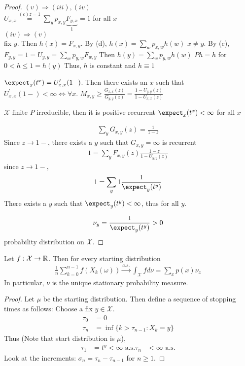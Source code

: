 \documentclass[mfit.tex]{subfiles}
\begin{document}
\begin{proof}
  $(v) \Rightarrow (iii),(iv)$\\
  $U_{x,x} \overset{(c) z=1}{=} \sum_y p_{x,y} \underbrace{F_{y,x}}_{1} = 1$ for all $x$\\
  $(iv) \Rightarrow (v)$\\
  fix $y$. Then $h(x) = F_{x,y}$. By (d), $h(x) = \sum_w p_{x,w} h(w)$ $x \neq y$.
  By (c), $F_{y,y} = 1 = U_{y,y} = \sum_w p_{y,w} F_{w,y}$
  Then $h(y) = \sum_w p_{y,w} h(w)$
  $P h = h$ for $0 < h \leq 1 = h(y)$
  Thus, $h$ is constant and $h \equiv 1$
  
  $\expect_x(t^x) = U_{x,x}^\prime(1-)$.
  Then there exists an $x$ such that $U_{x,x}^\prime (1-) < \infty \iff \forall x$.
  $M_{x,y} \geq \frac{G_{x,x}(z)}{G_{y,y}(z)} = \frac{1 - U_{y,y}(z)}{1- U_{x,x}(z)}$
  
  $\mathcal{X}$ finite $P$ irreducible, then it is positive recurrent $\expect_x(t^x) < \infty$ for all $x$
  
  \begin{align*}
    \sum_y G_{x,y}(z) = \frac{1}{1-z}
  \end{align*}
  Since $z \to 1-$, there exists a $y$ such that $G_{x,y} = \infty$ is recurrent
  \begin{align*}
    1 = \sum_y F_{x,y}(z) \frac{1-z}{1-U_{y,y}(z)}
  \end{align*}
  since $z \to 1-$,
  \begin{align*}
    1 = \sum_y 1 \frac{1}{\expect_y(t^y)}
  \end{align*}
  There exists a $y$ such that $\expect_y(t^y) < \infty$, thus for all $y$.
  
  \begin{align*}
    \nu_y = \frac{1}{\expect_y(t^y)} > 0 
  \end{align*}
  probability distribution on $\mathcal{X}$.
\end{proof}

\begin{theorem}
  Let $f: \mathcal{X} \to \mathbb{R}$. Then for every starting distribution
  \begin{align*}
    \frac{1}{n} \sum_{k=0}^{n-1} f(X_k(\omega)) \overset{a.s.}{\to} \int_\mathcal{X} f d\nu = \sum_x p(x) \nu_x
  \end{align*}
  In particular, $\nu$ is the unique stationary probability measure.
\end{theorem}

\begin{proof}
  Let $\mu$ be the starting distribution. Then define a sequence of stopping times as follows: Choose a fix $y \in \mathcal{X}$.
  \begin{align*}
    \tau_0 &= 0 \\
    \tau_n &= \inf \{k > \tau_{n-1}: X_k = y \}
  \end{align*}
  Thus (Note that start distribution is $\mu$),
  \begin{align*}
    \tau_1 &= t^y < \infty \text{ a.s.}
    \tau_n &< \infty \text{ a.s.}
  \end{align*}
  Look at the increments: $\sigma_n = \tau_n - \tau_{n-1}$ for $n \geq 1$.
\end{proof}
\end{document}
